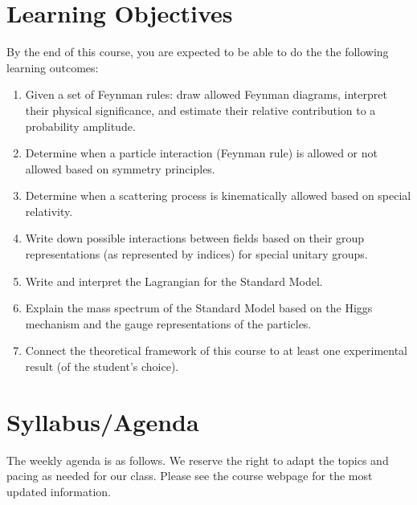 \documentclass[12pt]{article}
\numberwithin{equation}{section}    %
\begin{document}
\section{Learning Objectives}

By the end of this course, you are expected to be able to do the the following learning outcomes:
\begin{enumerate}
	\item Given a set of Feynman rules: draw allowed Feynman diagrams, interpret their physical significance, and estimate their relative contribution to a probability amplitude.
	\item Determine when a particle interaction (Feynman rule) is allowed or not allowed based on symmetry principles.
	\item Determine when a scattering process is kinematically allowed based on special relativity.
	\item Write down possible interactions between fields based on their group representations (as represented by indices) for special unitary groups.
	\item Write and interpret the Lagrangian for the Standard Model.
	\item Explain the mass spectrum of the Standard Model based on the Higgs mechanism and the gauge representations of the particles.
	\item Connect the theoretical framework of this course to at least one experimental result (of the student's choice).
\end{enumerate}








\section{Syllabus/Agenda}

The weekly agenda is as follows. 
We reserve the right to adapt the topics and pacing as needed for our class. Please see the course webpage for the most updated information.
\end{document}
